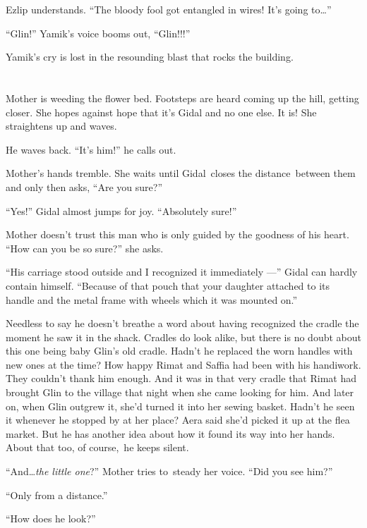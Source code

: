 \documentclass[twoside,11pt]{book}
\begin{document}
Ezlip understands. ``The bloody fool got entangled in wires! It's going to{\ldots}''

``Glin!'' Yamik's voice booms{ }out,
``Glin!!!''

Yamik's cry is lost in the resounding blast that rocks the building.


\bigskip

\chapter{}

Mother is weeding the flower bed. Footsteps are heard coming up the hill, getting closer. She hopes against hope that
it's Gidal and{ }no one else. It is! She straightens up and waves.

He waves back. ``It's him!'' he calls out.

Mother's hands tremble. She waits until Gidal~closes the distance~between them and only then
asks,{ }``Are you sure?''

``Yes!'' Gidal almost jumps for joy. ``Absolutely sure!''

Mother doesn't trust this man who is only guided by the goodness of his heart. ``How can you be so sure?'' she asks.

``His carriage stood outside and I recognized it immediately ---'' Gidal can hardly contain
himself. ``Because of that pouch that your daughter attached to its handle and the metal frame with wheels
which it was mounted on.''

Needless to say he doesn't breathe a word about having recognized the cradle the moment he saw it in the shack. Cradles
do look alike, but there is no doubt about this one being baby Glin's old cradle. Hadn't he replaced the worn handles
with new ones at the time? How happy Rimat and Saffia had been with his handiwork. They couldn't thank him
enough{. }And it was in that very cradle that Rimat had
brought{ }Glin to the village that night when she came looking for him. And
later on, when Glin outgrew it, she'd turned it into her sewing basket. Hadn't he seen it whenever he stopped
by{ }at{ }her place? Aera said she'd picked it up at the flea market. But he has
another idea about how it found its way into her hands. About that too, of course,~he keeps silent.

``And{\ldots}\textit{the little one}?'' Mother tries to~steady her voice. ``Did
you see him?''

``Only from a distance.''

``How does he look?''
\end{document}
